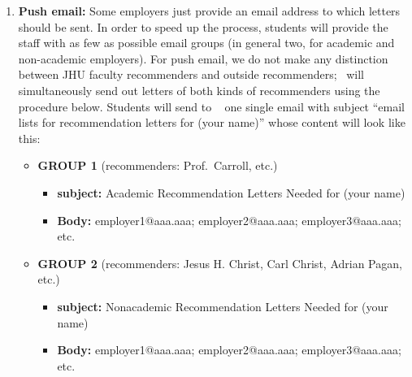 \documentclass{\econtex}
\begin{document}
\begin{enumerate}
  In order for us to keep track of letters in a centralized way, and
  to relieve recommenders of the burden of figuring out how to
  upload their letters, our procedure is as follows.  When the
  employer asks for the email address of a JHU faculty recommender, you should
  always reply with \jmstaffemail~rather than the faculty member's
  actual email.

  If the recommender is not a JHU faculty member but they would like \JMStaff~to handle uploading their letters, you should just use \jmstaffemail~as the recommender's email address.  If the recommender \textit{wants} to handle their letters themselves, then you can give the employer their real email address.  But this is discouraged, because it means that we do not have any way to track whether the letters have been sent or not.

\item \textbf{Push email:} Some employers just provide an email address
  to which letters should be sent.  In order to speed up the process,
  students will provide the staff with as few as possible email groups
  (in general two, for academic and non-academic employers). For push email, we do not 
  make any distinction between JHU faculty recommenders and outside recommenders; \JMStaff~will
  simultaneously send out letters of both kinds of recommenders using the procedure below.  Students will send to \jmstaffemail~ one single email
  with subject ``email lists for recommendation letters for (your
  name)'' whose content will look like this: \small
  \begin{itemize}
  \item \textbf{ GROUP 1} (recommenders: Prof.\ Carroll, etc.)
    \begin{itemize}
    \item \textbf{ subject:} Academic Recommendation Letters Needed for (your name)
    \item \textbf{ Body:} employer1@aaa.aaa; employer2@aaa.aaa; employer3@aaa.aaa; etc.
    \end{itemize}

  \item \textbf{ GROUP 2} (recommenders: Jesus H. Christ, Carl Christ, Adrian Pagan, etc.)
    \begin{itemize}
    \item \textbf{ subject:} Nonacademic Recommendation Letters Needed for (your name)
    \item \textbf{ Body:} employer1@aaa.aaa; employer2@aaa.aaa; employer3@aaa.aaa; etc.
    \end{itemize}


\end{itemize}
\end{enumerate}
\end{document}

